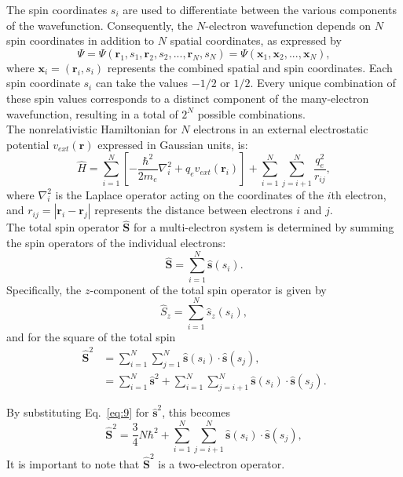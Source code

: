 \documentclass[%
 preprint, linenumbers,
 amsmath,amssymb,
 aps, physrev,
]{revtex4-2}
\begin{document}
The spin coordinates $s_i$ are used to differentiate between the various components of the wavefunction. Consequently, the $N$-electron wavefunction depends on $N$ spin coordinates in addition to $N$ spatial coordinates, as expressed by
\begin{equation}
    \Psi = \Psi(\mathbf{r}_1,s_1,\mathbf{r}_2,s_2,...,\mathbf{r}_N,s_N) = \Psi(\mathbf{x}_1,\mathbf{x}_2,...,\mathbf{x}_N),
\end{equation}
where $\mathbf{x}_i = (\mathbf{r}_i,s_i)$ represents the combined spatial and spin coordinates. Each spin coordinate $s_i$ can take the values $-1/2$ or $1/2$. Every unique combination of these spin values corresponds to a distinct component of the many-electron wavefunction, resulting in a total of $2^N$ possible combinations.\\

The nonrelativistic Hamiltonian for $N$ electrons in an external electrostatic potential $v_{ext}(\mathbf{r})$ expressed in Gaussian units, is:
\begin{equation}
    \hat{H} = \sum_{i=1}^{N}\left[ -\frac{\hbar^2}{2m_e}\nabla_i^2 + q_ev_{ext}(\mathbf{r}_i) \right] + \sum_{i=1}^{N}\sum_{j=i+1}^{N}\frac{q_e^2}{r_{ij}},
    \label{eq:14}
\end{equation}
where $\nabla_i^2$ is the Laplace operator acting on the coordinates of the $i$th electron, and $r_{ij} = |\mathbf{r}_i-\mathbf{r}_j|$ represents the distance between electrons $i$ and $j$.\\

The total spin operator $\hat{\mathbf{S}}$ for a multi-electron system is determined by summing the spin operators of the individual electrons:
\begin{equation}
    \hat{\mathbf{S}} = \sum_{i=1}^{N}\hat{\mathbf{s}}(s_i).
\end{equation}
Specifically, the $z$-component of the total spin operator is given by
\begin{equation}
    \hat{S}_z = \sum_{i=1}^{N}\hat{s}_z(s_i),
\end{equation}
and for the square of the total spin
\begin{align*}
    \hat{\mathbf{S}}^2 &= \sum_{i=1}^{N}\sum_{j=1}^{N}\hat{\mathbf{s}}(s_i)\cdot\hat{\mathbf{s}}(s_j), \\
    &= \sum_{i=1}^{N} \hat{\mathbf{s}}^2 + \sum_{i=1}^{N}\sum_{j=i+1}^{N}\hat{\mathbf{s}}(s_i)\cdot\hat{\mathbf{s}}(s_j).
\end{align*}

By substituting Eq.~\eqref{eq:9} for $\hat{\mathbf{s}}^2$, this becomes
\begin{equation}
    \hat{\mathbf{S}}^2 = \frac{3}{4}N\hbar^2 + \sum_{i=1}^{N}\sum_{j=i+1}^{N}\hat{\mathbf{s}}(s_i)\cdot\hat{\mathbf{s}}(s_j),
    \label{eq:17}
\end{equation}
It is important to note that $\hat{\mathbf{S}}^2$ is a two-electron operator.\\
\end{document}
